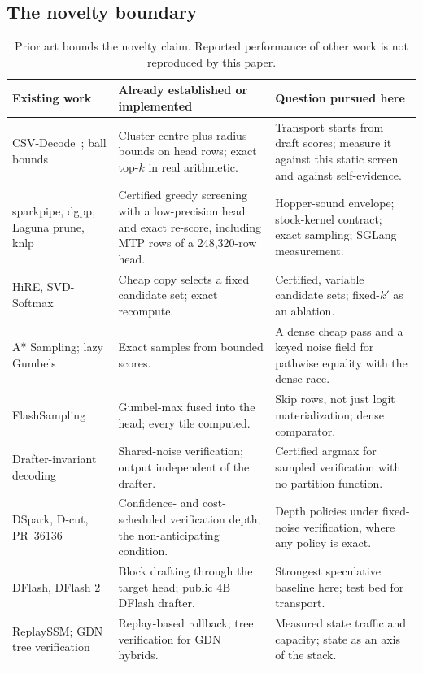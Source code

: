 \subsection{The novelty boundary}\label{sec:prior-novelty}
\begin{table}[tbp]
\small\centering
\begin{tabularx}{\linewidth}{@{}P{3.0cm}YY@{}}\toprule
Existing work & Already established or implemented & Question pursued here\\\midrule
CSV-Decode~\cite{csvdecode}; ball bounds~\cite{ramgray2012} & Cluster centre-plus-radius bounds on head rows; exact top-$k$ in real arithmetic. & Transport starts from draft scores; measure it against this static screen and against self-evidence.\\
sparkpipe, dgpp, Laguna prune, knlp~\cite{sparkpipehead,dgpphead,lagunaprune,knlphead} & Certified greedy screening with a low-precision head and exact re-score, including MTP rows of a 248,320-row head. & Hopper-sound envelope; stock-kernel contract; exact sampling; SGLang measurement.\\
HiRE, SVD-Softmax~\cite{hire,svdsoftmax} & Cheap copy selects a fixed candidate set; exact recompute. & Certified, variable candidate sets; fixed-$k'$ as an ablation.\\
A* Sampling; lazy Gumbels~\cite{astar,mussmann2017} & Exact samples from bounded scores. & A dense cheap pass and a keyed noise field for pathwise equality with the dense race.\\
FlashSampling~\cite{flashsampling} & Gumbel-max fused into the head; every tile computed. & Skip rows, not just logit materialization; dense comparator.\\
Drafter-invariant decoding~\cite{daliri2025,rowan2025} & Shared-noise verification; output independent of the drafter. & Certified argmax for sampled verification with no partition function.\\
DSpark, D-cut, PR~36136~\cite{dspark,dcut,pr36136} & Confidence- and cost-scheduled verification depth; the non-anticipating condition. & Depth policies under fixed-noise verification, where any policy is exact.\\
DFlash, DFlash 2~\cite{dflashpaper,dflash4bcard,dflash} & Block drafting through the target head; public 4B DFlash drafter. & Strongest speculative baseline here; test bed for transport.\\
ReplaySSM; GDN tree verification~\cite{replayssm,gdncode,treewy,bole} & Replay-based rollback; tree verification for GDN hybrids. & Measured state traffic and capacity; state as an axis of the stack.\\\bottomrule
\end{tabularx}
\caption{Prior art bounds the novelty claim. Reported performance of other work is not reproduced by this paper.}
\label{tab:prior}
\end{table}
